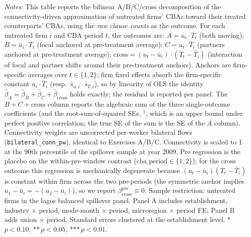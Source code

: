 \begin{table}[H]
\begin{minipage}{\linewidth}
\smallskip
\scriptsize\textit{Notes:} This table reports the bilinear A/B/C/cross decomposition of the connectivity-driven approximation of untreated firms' CBAs toward their treated counterparts' CBAs, using the \emph{raw clause counts} as the outcome. For each untreated firm $i$ and CBA period $t$, the outcomes are: $A = u_t \cdot T_t$ (both moving); $B = \bar u_i \cdot T_t$ (focal anchored at pre-treatment average); $C = u_t \cdot \bar T_i$ (partners anchored at pre-treatment average); $\text{cross} = (u_t - \bar u_i) \cdot (T_t - \bar T_i)$ (interaction of focal and partner shifts around their pre-treatment anchors). Anchors are firm-specific averages over $t \in \{1, 2\}$; firm fixed effects absorb the firm-specific constant $\bar u_i \cdot \bar T_i$ (resp.\ $\bar s_{u,i} \cdot \bar s_{T,i}$), so by linearity of OLS the identity $\hat\beta_A = \hat\beta_B + \hat\beta_C + \hat\beta_{\text{cross}}$ holds exactly; the residual is reported per panel. The $B{+}C{+}\text{cross}$ column reports the algebraic sum of the three single-outcome coefficients (and the root-sum-of-squared SEs, $^\dagger$, which is an upper bound under perfect positive correlation; the true SE of the sum is the SE of the $A$ column). Connectivity weights are uncorrected per-worker bilateral flows (\texttt{bilateral\_conn\_pw}), identical to Exercises A/B/C. Connectivity is scaled to 1 at the 90th percentile of the spillover sample at year 2009. Pre regression is the placebo on the within-pre-window contrast ($\text{cba\_period} \in \{1,2\}$); for the $\text{cross}$ outcome this regression is mechanically degenerate because $(u_t - \bar u_i)(T_t - \bar T_i)$ is constant within firm across the two pre-periods (the symmetric anchor implies $u_1 - \bar u_i = -(u_2 - \bar u_i)$), so we report $\beta_{\text{cross}}^{\text{pre}} \equiv 0$. Sample restriction: untreated firms in the lagos balanced spillover panel. Panel A includes establishment, industry $\times$ period, mode-month $\times$ period, microregion $\times$ period FE; Panel B adds union $\times$ period. Standard errors clustered at the establishment level. *\,$p<0.10$, **\,$p<0.05$, ***\,$p<0.01$.
\end{minipage}
\end{table}
